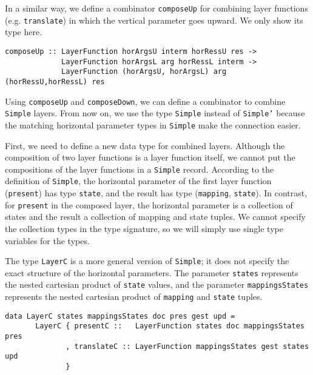 In a similar way, we define a combinator \texttt{composeUp} for combining layer functions (e.g. \texttt{translate}) in which the vertical parameter goes upward. We only show its type here.

\begin{small}
\begin{verbatim}
composeUp :: LayerFunction horArgsU interm horRessU res ->
             LayerFunction horArgsL arg horRessL interm ->
             LayerFunction (horArgsU, horArgsL) arg (horRessU,horRessL) res
\end{verbatim}
\end{small}


 Using \texttt{composeUp} and \texttt{composeDown}, we can define a combinator to combine \texttt{Simple} layers. From now on, we use the type \texttt{Simple} instead of \texttt{Simple'} because the matching horizontal parameter types in \texttt{Simple} make the connection easier. 

First, we need to define a new data type for combined layers. Although the composition of two layer functions is a layer function itself, we cannot put the compositions of the layer functions in a \texttt{Simple} record. According to the definition of \texttt{Simple}, the horizontal parameter of the first layer function (\texttt{present}) has type \texttt{state}, and the result has type (\texttt{mapping}, \texttt{state}). In contrast, for \texttt{present} in the composed layer, the horizontal parameter is a collection of states and the result a collection of mapping and state tuples. We cannot specify the collection types in the type signature, so we will simply use single type variables for the types.

The type \texttt{LayerC} is a more general version of \texttt{Simple}; it does not specify the exact structure of the horizontal parameters. The parameter \texttt{states} represents the nested cartesian product of \texttt{state} values, and the parameter \texttt{mappingsStates} represents the nested cartesian product of \texttt{mapping} and \texttt{state} tuples.

\begin{small}
\begin{verbatim}
data LayerC states mappingsStates doc pres gest upd =
       LayerC { presentC ::   LayerFunction states doc mappingsStates pres
              , translateC :: LayerFunction mappingsStates gest states upd
              }

\end{verbatim}
\end{small}

